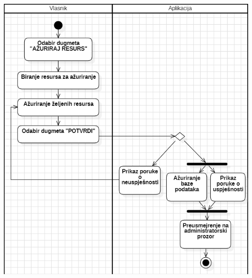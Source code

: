 \documentclass{scrreprt}
\begin{document}
\begin{center}
	\includegraphics[width=14cm]{./img/11.png}
\end{center}

\pagebreak
\end{document}
